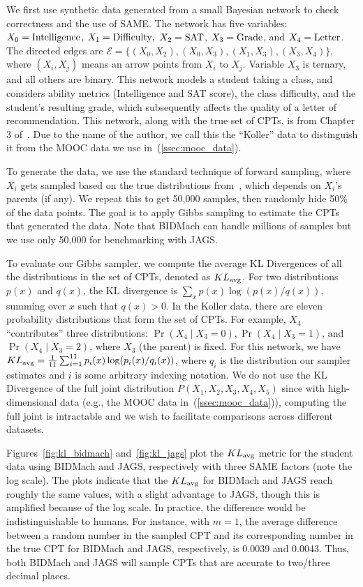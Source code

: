 \documentclass{article} %
\begin{document}
We first use synthetic data generated from a small Bayesian network to check correctness
and the use of SAME. The network has five variables: $X_0 = {\rm Intelligence}$, $X_1 =
{\rm Difficulty},$ $X_2 = {\rm SAT}$, $X_3 = {\rm Grade}$, and $X_4 = {\rm Letter}$. The directed
edges are $\mathcal{E} = \{(X_0, X_2), (X_0, X_3), (X_1,X_3), (X_3,X_4)\}$, where $(X_i,X_j)$ means
an arrow points from $X_i$ to $X_j$.  Variable $X_3$ is ternary, and all others are binary. This
network models a student taking a class, and considers ability metrics (Intelligence and SAT score),
the class difficulty, and the student's resulting grade, which subsequently affects the quality of a
letter of recommendation. This network, along with the true set of CPTs, is from Chapter 3
of~\citet{Koller2009}. Due to the name of the author, we call this the ``Koller'' data to
distinguish it from the MOOC data we use in~(\ref{ssec:mooc_data}).

To generate the data, we use the standard technique of forward sampling, where $X_i$ gets sampled
based on the true distributions from~\citet{Koller2009}, which depends on $X_i$'s parents (if any).
We repeat this to get 50,000 samples, then randomly hide 50\% of the data points. The goal is to
apply Gibbs sampling to estimate the CPTs that generated the data. Note that BIDMach can handle
millions of samples but we use only 50,000 for benchmarking with JAGS.

To evaluate our Gibbs sampler, we compute the average KL Divergences of all the distributions in the
set of CPTs, denoted as $KL_{\rm avg}$.  For two distributions $p(x)$ and $q(x)$, the KL divergence
is $\sum_x p(x) \log(p(x)/q(x))$, summing over $x$ such that $q(x) > 0$.  In the Koller data, there
are eleven probability distributions that form the set of CPTs. For example, $X_4$ ``contributes''
three distributions: $\Pr(X_4 \mid X_3 = 0), \Pr(X_4 \mid X_3 = 1)$, and $\Pr(X_4 \mid X_3 = 2)$,
where $X_3$ (the parent) is fixed. For this network, we have $KL_{\rm avg} = \frac{1}{11}
\sum_{i=1}^{11} p_i(x) \log(p_i(x)/q_i(x))$, where $q_i$ is the distribution our sampler estimates
and $i$ is some arbitrary indexing notation. We do not use the KL Divergence of the full joint
distribution $P(X_1,X_2,X_3,X_4,X_5)$ since with high-dimensional data (e.g., the MOOC data
in~(\ref{ssec:mooc_data})), computing the full joint is intractable and we wish to facilitate
comparisons across different datasets.

Figures~\ref{fig:kl_bidmach} and~\ref{fig:kl_jags} plot the $KL_{\rm avg}$ metric for the student
data using BIDMach and JAGS, respectively with three SAME factors (note the log scale). The plots
indicate that the $KL_{\rm avg}$ for BIDMach and JAGS reach roughly the same values, with a slight
advantage to JAGS, though this is amplified because of the log scale. In practice, the difference
would be indistinguishable to humans. For instance, with $m=1$, the average difference between a
random number in the sampled CPT and its corresponding number in the true CPT for BIDMach and JAGS,
respectively, is 0.0039 and 0.0043. Thus, both BIDMach and JAGS will sample CPTs that are accurate
to two/three decimal places.
\end{document}
